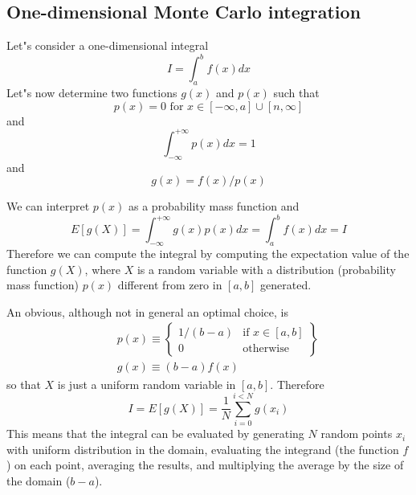 \documentclass[justified, sixbynine]{tufte-book}
\theoremstyle{plain}%
\newtheorem * {corollary}{Corollary}
\theoremstyle{definition}
\theoremstyle{remark}
\newtheorem * {remark}{Remark}
\newtheorem * {note}{Note}
\begin{document}
\begin{fullwidth}
\goodbreak\subsection{One-dimensional Monte Carlo integration}

Let"s consider a one-dimensional integral
\begin{equation}
I=\int_a^bf(x)dx
\end{equation}
Let"s now determine two functions $g(x)$ and $p(x)$ such that
\begin{equation}
p(x)=0\text{ for }x\in [-\infty , a]\cup [n, \infty ]
\end{equation}
and
\begin{equation}
\int_{-\infty }^{+\infty }p(x)dx=1
\end{equation}
and
\begin{equation}
g(x)=f(x)/p(x)
\end{equation}

We can interpret $p(x)$ as a probability mass function and
\begin{equation}
E[g(X)]=\int_{-\infty }^{+\infty }g(x)p(x)dx=\int_a^bf(x)dx=I
\end{equation}
Therefore we can compute the integral by computing the expectation value of
the function $g(X)$, where $X$ is a random variable with a distribution
(probability mass function) $p(x)$ different from zero in $[a, b]$ generated.

An obvious, although not in general an optimal choice, is
\begin{eqnarray}
&&p(x)\equiv \left\{
\begin{array}{ll}
1/(b-a) & \text{if }x\in [a, b] \\
0 & \text{otherwise}
\end{array}
\right\}   \label{defchoice} \\
&&g(x)\equiv (b-a)f(x)  \nonumber
\end{eqnarray}
so that $X$ is just a uniform random variable in $[a, b]$. Therefore
\begin{equation}
I=E\left[ g(X)\right] =\frac1N \sum_{i=0}^{i<N}g(x_i)
\end{equation}
This means that the integral can be evaluated by generating $N$ random
points $x_i$ with uniform distribution in the domain, evaluating the
integrand (the function $f$) on each point, averaging the results, and
multiplying the average by the size of the domain ($b-a$).


\end{fullwidth}
\end{document}
